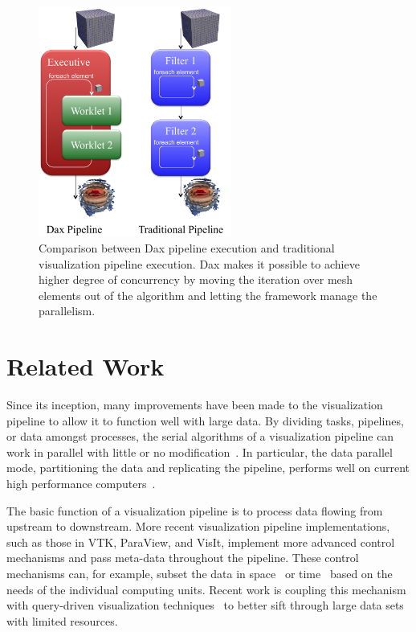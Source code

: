 \documentclass{vgtc}                          %
\newcommand*{\lcite}[1]{~\cite{#1}}
\begin{document}
\begin{figure}
  \centering
  \includegraphics[width=2.5in]{images/DaxPipelineVsTraditionalPipeline}
  \caption{Comparison between Dax pipeline execution and traditional
    visualization pipeline execution. Dax makes it possible to achieve higher
    degree of concurrency by moving the iteration over mesh elements out of the
    algorithm and letting the framework manage the parallelism.}
  \label{fig:DaxPipelineVsTraditionalPipeline}
\end{figure}

\section{Related Work}
\label{sec:RelatedWork}

Since its inception, many improvements have been made to the visualization
pipeline to allow it to function well with large data.  By dividing tasks,
pipelines, or data amongst processes, the serial algorithms of a
visualization pipeline can work in parallel with little or no
modification\lcite{Ahrens00}.  In particular, the data parallel
mode, partitioning the data and replicating the pipeline, performs
well on current high performance computers\lcite{Cedilnik06}.

The basic function of a visualization pipeline is to process data flowing
from upstream to downstream.  More recent visualization pipeline
implementations, such as those in VTK, ParaView, and VisIt, implement more
advanced control mechanisms and pass meta-data throughout the pipeline.
These control mechanisms can, for example, subset the data in
space\lcite{Childs05} or time\lcite{Biddiscombe07} based on the needs of
the individual computing units.  Recent work is coupling this mechanism
with query-driven visualization techniques\lcite{Gosink08} to better sift
through large data sets with limited resources.
\end{document}
